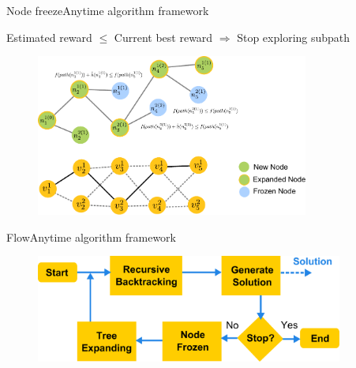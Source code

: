 \begin{frame}{Node freeze}{Anytime algorithm framework}

Estimated reward $ \leq $ Current best reward 
$ \Longrightarrow $ Stop exploring subpath

\begin{figure}
\centering
\includegraphics[width =  0.8\textwidth]{./figure/freeze_process}
\end{figure}

\end{frame}

\begin{frame}{Flow}{Anytime algorithm framework}

\begin{figure}
\centering
\includegraphics[width = 0.9\textwidth]{./figure/alg_flow}
\end{figure}

\end{frame}

